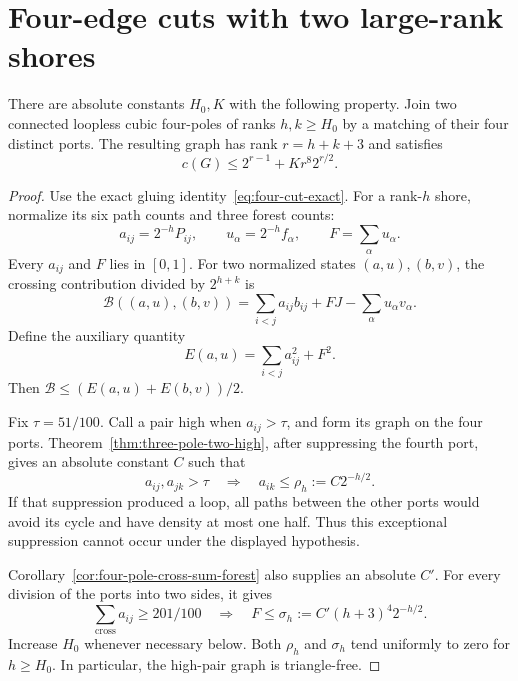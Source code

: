 \section{Four-edge cuts with two large-rank shores}
\label{sec:four-cut-large-shores}

\begin{theorem}\label{thm:four-cut-large-shores}
There are absolute constants $H_0,K$ with the following property.
Join two connected loopless cubic four-poles of ranks $h,k\ge H_0$
by a matching of their four distinct ports.
The resulting graph has rank $r=h+k+3$ and satisfies
\[
 c(G)\le2^{r-1}+Kr^8 2^{r/2}.
\]
\end{theorem}

\begin{proof}
Use the exact gluing identity~\eqref{eq:four-cut-exact}.
For a rank-$h$ shore, normalize its six path counts and three forest counts:
\[
 a_{ij}=2^{-h}P_{ij},\qquad u_\alpha=2^{-h}f_\alpha,
 \qquad F=\sum_\alpha u_\alpha.
\]
Every $a_{ij}$ and $F$ lies in $[0,1]$.
For two normalized states $(a,u),(b,v)$, the crossing contribution divided
by $2^{h+k}$ is
\begin{equation}\label{eq:four-cut-bilinear}
 \mathcal B((a,u),(b,v))
 =\sum_{i<j}a_{ij}b_{ij}+FJ-\sum_\alpha u_\alpha v_\alpha.
\end{equation}
Define the auxiliary quantity
\[
 E(a,u)=\sum_{i<j}a_{ij}^2+F^2.
\]
Then $\mathcal B\le(E(a,u)+E(b,v))/2$.

Fix $\tau=51/100$.
Call a pair high when $a_{ij}>\tau$, and form its graph on the four ports.
Theorem~\ref{thm:three-pole-two-high}, after suppressing the fourth port,
gives an absolute constant $C$ such that
\begin{equation}\label{eq:four-cut-small-wedge}
 a_{ij},a_{jk}>\tau\quad\Longrightarrow\quad
 a_{ik}\le\rho_h:=C2^{-h/2}.
\end{equation}
If that suppression produced a loop, all paths between the other ports
would avoid its cycle and have density at most one half.
Thus this exceptional suppression cannot occur under the displayed hypothesis.

Corollary~\ref{cor:four-pole-cross-sum-forest} also supplies an absolute $C'$.
For every division of the ports into two sides, it gives
\begin{equation}\label{eq:four-cut-small-forest}
 \sum_{\mathrm{cross}}a_{ij}\ge201/100
 \quad\Longrightarrow\quad
 F\le\sigma_h:=C'(h+3)^4 2^{-h/2}.
\end{equation}
Increase $H_0$ whenever necessary below.
Both $\rho_h$ and $\sigma_h$ tend uniformly to zero for $h\ge H_0$.
In particular, the high-pair graph is triangle-free.


\end{proof}
